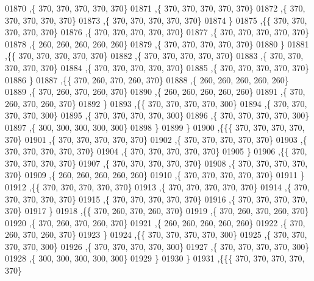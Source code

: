 \begin{DoxyCode}
01870    ,\{   370,   370,   370,   370,   370\}
01871    ,\{   370,   370,   370,   370,   370\}
01872    ,\{   370,   370,   370,   370,   370\}
01873    ,\{   370,   370,   370,   370,   370\}
01874    \}
01875   ,\{\{   370,   370,   370,   370,   370\}
01876    ,\{   370,   370,   370,   370,   370\}
01877    ,\{   370,   370,   370,   370,   370\}
01878    ,\{   260,   260,   260,   260,   260\}
01879    ,\{   370,   370,   370,   370,   370\}
01880    \}
01881   ,\{\{   370,   370,   370,   370,   370\}
01882    ,\{   370,   370,   370,   370,   370\}
01883    ,\{   370,   370,   370,   370,   370\}
01884    ,\{   370,   370,   370,   370,   370\}
01885    ,\{   370,   370,   370,   370,   370\}
01886    \}
01887   ,\{\{   370,   260,   370,   260,   370\}
01888    ,\{   260,   260,   260,   260,   260\}
01889    ,\{   370,   260,   370,   260,   370\}
01890    ,\{   260,   260,   260,   260,   260\}
01891    ,\{   370,   260,   370,   260,   370\}
01892    \}
01893   ,\{\{   370,   370,   370,   370,   300\}
01894    ,\{   370,   370,   370,   370,   300\}
01895    ,\{   370,   370,   370,   370,   300\}
01896    ,\{   370,   370,   370,   370,   300\}
01897    ,\{   300,   300,   300,   300,   300\}
01898    \}
01899   \}
01900  ,\{\{\{   370,   370,   370,   370,   370\}
01901    ,\{   370,   370,   370,   370,   370\}
01902    ,\{   370,   370,   370,   370,   370\}
01903    ,\{   370,   370,   370,   370,   370\}
01904    ,\{   370,   370,   370,   370,   370\}
01905    \}
01906   ,\{\{   370,   370,   370,   370,   370\}
01907    ,\{   370,   370,   370,   370,   370\}
01908    ,\{   370,   370,   370,   370,   370\}
01909    ,\{   260,   260,   260,   260,   260\}
01910    ,\{   370,   370,   370,   370,   370\}
01911    \}
01912   ,\{\{   370,   370,   370,   370,   370\}
01913    ,\{   370,   370,   370,   370,   370\}
01914    ,\{   370,   370,   370,   370,   370\}
01915    ,\{   370,   370,   370,   370,   370\}
01916    ,\{   370,   370,   370,   370,   370\}
01917    \}
01918   ,\{\{   370,   260,   370,   260,   370\}
01919    ,\{   370,   260,   370,   260,   370\}
01920    ,\{   370,   260,   370,   260,   370\}
01921    ,\{   260,   260,   260,   260,   260\}
01922    ,\{   370,   260,   370,   260,   370\}
01923    \}
01924   ,\{\{   370,   370,   370,   370,   300\}
01925    ,\{   370,   370,   370,   370,   300\}
01926    ,\{   370,   370,   370,   370,   300\}
01927    ,\{   370,   370,   370,   370,   300\}
01928    ,\{   300,   300,   300,   300,   300\}
01929    \}
01930   \}
01931  ,\{\{\{   370,   370,   370,   370,   370\}

\end{DoxyCode}
